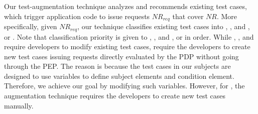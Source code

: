 Our test-augmentation technique analyzes and recommends existing test cases, which trigger
application code to issue requests $NR_{req}$ that cover $NR$.
More specifically, given $NR_{req}$, our technique classifies existing test cases into , , and ,
or . Note that classification priority is given to , , and ,
or  in order.
While , , and  require developers to modify existing
test cases,  require the developers to create new test cases issuing requests
directly evaluated by the PDP without going through the PEP. The reason is because the test cases in our subjects are
designed to use variables to define subject elements and condition element. Therefore,
we achieve our goal by modifying such variables. However, for , the augmentation technique requires the
developers to create new test cases manually.

 

